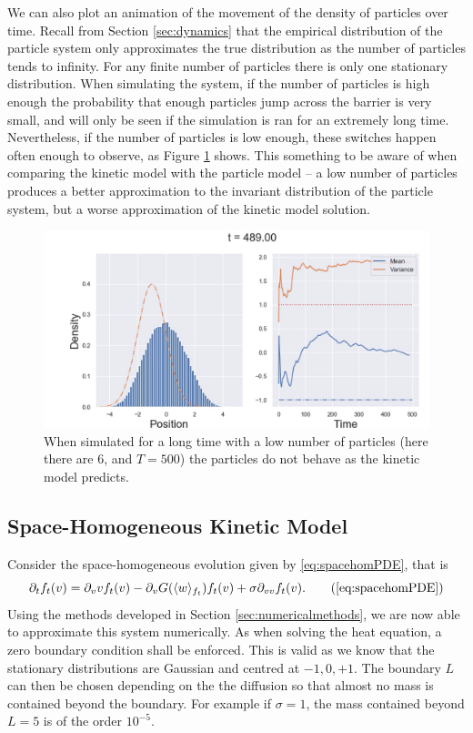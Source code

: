 We can also plot an animation of the movement of the density of particles over time. Recall from Section \ref{sec:dynamics} that the empirical distribution of the particle system only approximates the true distribution as the number of particles tends to infinity. For any finite number of particles there is only one stationary distribution. When simulating the system, if the number of particles is high enough the probability that enough particles jump across the barrier is very small, and will only be seen if the simulation is ran for an extremely long time. Nevertheless, if the number of particles is low enough, these switches happen often enough to observe, as Figure \ref{fig:switch} shows. This something to be aware of when comparing the kinetic model with the particle model -- a low number of particles produces a better approximation to the invariant distribution of the particle system, but a worse approximation of the kinetic model solution.

\begin{figure}
    \centering
    \includegraphics[width=\linewidth]{Figures/switch}
    \caption[Mean Zero Invariant Measure for the Particle System]{When simulated for a long time with a low number of particles (here there are 6, and $T=500$) the particles do not behave as the kinetic model predicts.}
    \label{fig:switch}
\end{figure}

\subsection{Space-Homogeneous Kinetic Model}\label{sec:homkin}
 Consider the space-homogeneous evolution given by \eqref{eq:spacehomPDE}, that is
    \begin{equation}
    \partial_t f_t(v) = \partial_v vf_t(v) - \partial_v G(\langle w \rangle_{f_t})f_t(v) + \sigma \partial_{vv} f_t(v).\tag{\ref{eq:spacehomPDE}}
    \end{equation}
    Using the methods developed in Section \ref{sec:numericalmethods}, we are now able to approximate this system numerically. As when solving the heat equation, a zero boundary condition shall be enforced. This is valid as we know that the stationary distributions are Gaussian and centred at $-1,0,+1$. The boundary $L$ can then be chosen depending on the the diffusion so that almost no mass is contained beyond the boundary. For example if $\sigma = 1$, the mass contained beyond $L=5$ is of the order $10^{-5}$. 
    
